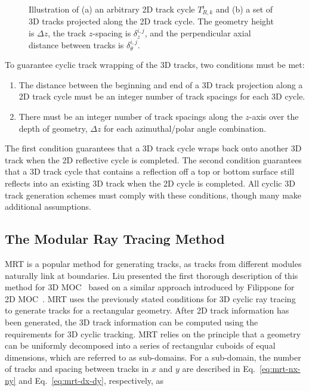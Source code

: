 \begin{figure}[h!]
\begin{subfigure}{0.45\textwidth}
		\caption{}
		\label{fig:projected-tracks-b}
	\end{subfigure}
	\caption[]{Illustration of (a) an arbitrary 2D track cycle $T_{R,k}^{i}$ and (b) a set of 3D tracks projected along the 2D track cycle. The geometry height is $\Delta z$, the track $z$-spacing is $\delta_z^{i,j}$, and the perpendicular axial distance between tracks is $\delta_{\theta}^{i,j}$.}
	\label{fig:projected-tracks}
\end{figure}


To guarantee cyclic track wrapping of the 3D tracks, two conditions must be met:

\begin{enumerate}
	\item The distance between the beginning and end of a 3D track projection along a 2D track cycle must be an integer number of track spacings for each 3D cycle.
	\item There must be an integer number of track spacings along the $z$-axis over the depth of geometry, $\Delta z$ for each azimuthal/polar angle combination.
\end{enumerate}

The first condition guarantees that a 3D track cycle wraps back onto another 3D track when the 2D reflective cycle is completed. The second condition guarantees that a 3D track cycle that contains a reflection off a top or bottom surface still reflects into an existing 3D track when the 2D cycle is completed. All cyclic 3D track generation schemes must comply with these conditions, though many make additional assumptions.

\subsection{The Modular Ray Tracing Method}

\ac{MRT} is a popular method for generating tracks, as tracks from different modules naturally link at boundaries. Liu presented the first thorough description of this method for 3D \ac{MOC}~\cite{liu_mrt} based on a similar approach introduced by Filippone for 2D \ac{MOC}~\cite{orig-moc-rt}. \ac{MRT} uses the previously stated conditions for 3D cyclic ray tracing to generate tracks for a rectangular geometry. After 2D track information has been generated, the 3D track information can be computed using the requirements for 3D cyclic tracking. \ac{MRT} relies on the principle that a geometry can be uniformly decomposed into a series of rectangular cuboids of equal dimensions, which are referred to as sub-domains. For a sub-domain, the number of tracks and spacing between tracks in $x$ and $y$ are described in Eq.~\ref{eq:mrt-nx-ny} and Eq.~\ref{eq:mrt-dx-dy}, respectively, as

